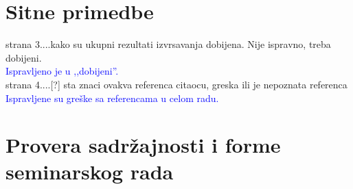 \documentclass[a4paper]{report}
\newcommand{\odgovor}[1]{\textcolor{blue}{#1}}
\begin{document}
\section{Sitne primedbe}

strana 3....kako su ukupni rezultati izvrsavanja dobijena. Nije ispravno, treba dobijeni.\\
\odgovor{Ispravljeno je u ,,dobijeni''.}\\
strana 4....[?] sta znaci ovakva referenca citaocu, greska ili je nepoznata referenca\\
\odgovor{Ispravljene su greške sa referencama u celom radu.}\\


\section{Provera sadržajnosti i forme seminarskog rada}
\end{document}
